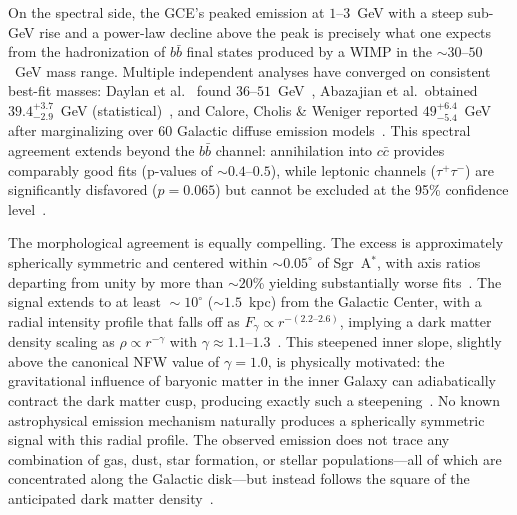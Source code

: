 On the spectral side, the GCE's peaked emission at $1$--$3$~GeV with a steep sub-GeV rise and a power-law decline above the peak is precisely what one expects from the hadronization of $b\bar{b}$ final states produced by a WIMP in the $\sim 30$--$50$~GeV mass range.
Multiple independent analyses have converged on consistent best-fit masses: Daylan et al.
\ found $36$--$51$~GeV~\cite{Daylan:2014rsa}, Abazajian et al.\ obtained $39.4^{+3.7}_{-2.9}$~GeV (statistical)~\cite{Abazajian:2014fta}, and Calore, Cholis \& Weniger reported $49^{+6.4}_{-5.4}$~GeV after marginalizing over 60 Galactic diffuse emission models~\cite{Calore:2014xka}.
This spectral agreement extends beyond the $b\bar{b}$ channel: annihilation into $c\bar{c}$ provides comparably good fits (p-values of $\sim 0.4$--$0.5$), while leptonic channels ($\tau^+\tau^-$) are significantly disfavored ($p = 0.065$) but cannot be excluded at the 95\% confidence level~\cite{Calore:2014xka}.

The morphological agreement is equally compelling.
The excess is approximately spherically symmetric and centered within $\sim 0.05^\circ$ of Sgr~A$^*$, with axis ratios departing from unity by more than $\sim 20$\% yielding substantially worse fits~\cite{Daylan:2014rsa}.
The signal extends to at least $\sim 10^\circ$ ($\sim 1.5$~kpc) from the Galactic Center, with a radial intensity profile that falls off as $F_\gamma \propto r^{-(2.2\text{--}2.6)}$, implying a dark matter density scaling as $\rho \propto r^{-\gamma}$ with $\gamma \approx 1.1$--$1.3$~\cite{Daylan:2014rsa, Abazajian:2014fta, Calore:2014xka}.
This steepened inner slope, slightly above the canonical NFW value of $\gamma = 1.0$, is physically motivated: the gravitational influence of baryonic matter in the inner Galaxy can adiabatically contract the dark matter cusp, producing exactly such a steepening~\cite{Goodenough:2009gk}.
No known astrophysical emission mechanism naturally produces a spherically symmetric signal with this radial profile.
The observed emission does not trace any combination of gas, dust, star formation, or stellar populations---all of which are concentrated along the Galactic disk---but instead follows the square of the anticipated dark matter density~\cite{Daylan:2014rsa}.

